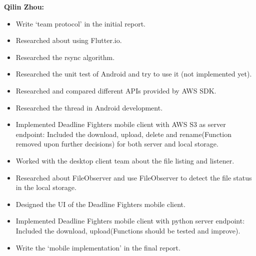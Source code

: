 \textbf{Qilin Zhou:}
\begin{itemize}
\item Write ‘team protocol’ in the initial report.
\item Researched about using Flutter.io.
\item Researched the rsync algorithm.
\item Researched the unit test of Android and try to use it (not implemented yet).
\item Researched and compared different APIs provided by AWS SDK.
\item Researched the thread in Android development.
\item Implemented Deadline Fighters mobile client with AWS S3 as server endpoint: Included the download, upload, delete and rename(Function removed upon further decisions) for both server and local storage.
\item Worked with the desktop client team about the file listing and listener.
\item Researched about FileObserver and use FileObserver to detect the file status in the local storage.
\item Designed the UI of the Deadline Fighters mobile client.
\item Implemented Deadline Fighters mobile client with python server endpoint: Included the download, upload(Functions should be tested and improve).
\item Write the ‘mobile implementation’ in the final report.
\end{itemize}

